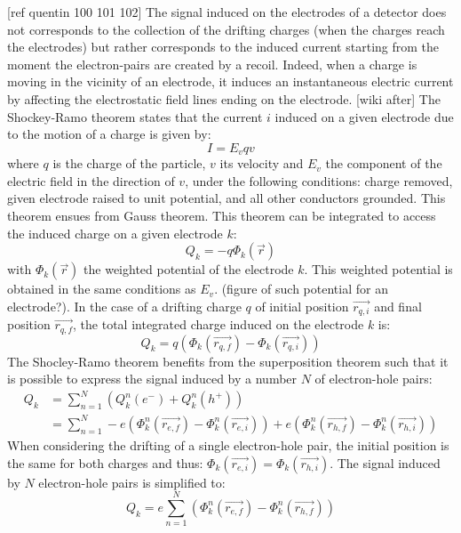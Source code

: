 [ref quentin 100 101 102]
The signal induced on the electrodes of a detector does not corresponds to the collection of the drifting charges (when the charges reach the electrodes) but rather corresponds to the induced current starting from the moment the electron-pairs are created by a recoil. Indeed, when a charge is moving in the vicinity of an electrode, it induces an instantaneous electric current by affecting the electrostatic field lines ending on the electrode. 
[wiki after]
The Shockey-Ramo theorem states that the current $i$ induced on a given electrode due to the motion of a charge is given by:
\begin{equation}
I = E_v q v
\end{equation}
where $q$ is the charge of the particle, $v$ its velocity and $E_v$ the component of the electric field in the direction of $v$, under the following conditions: charge removed, given electrode raised to unit potential, and all other conductors grounded. This theorem ensues from Gauss theorem.
This theorem can be integrated to access the induced charge on a given electrode $k$:
\begin{equation}
Q_k = - q \Phi_k(\vec{r})
\end{equation}
with $\Phi_k(\vec{r})$ the weighted potential of the electrode $k$. This weighted potential is obtained in the same conditions as $E_v$. (figure of such potential for an electrode?).
In the case of a drifting charge $q$ of initial position $\vec{r_{q,i}}$ and final position $\vec{r_{q,f}}$, the total integrated charge induced on the electrode $k$ is:
\begin{equation}
Q_k = q \left( \Phi_k (\vec{r_{q,f}}) - \Phi_k (\vec{r_{q,i}}) \right)
\end{equation}
The Shocley-Ramo theorem benefits from the superposition theorem such that it is possible to express the signal induced by a number $N$ of electron-hole pairs:
\begin{align}
Q_k &= \sum_{n=1}^{N} \left( Q_k^n(e^-) + Q_k^n(h^+) \right) \\
&= \sum_{n=1}^{N} -e \left( \Phi_k^n (\vec{r_{e,f}}) - \Phi_k^n (\vec{r_{e,i}}) \right) +e \left( \Phi_k^n (\vec{r_{h,f}}) - \Phi_k^n (\vec{r_{h,i}}) \right)
\end{align}
When considering the drifting of a single electron-hole pair, the initial position is the same for both charges and thus: $\Phi_k (\vec{r_{e,i}}) = \Phi_k (\vec{r_{h,i}})$.
The signal induced by $N$ electron-hole pairs is simplified to:
\begin{equation}
Q_k = e \sum_{n=1}^{N} \left( \Phi_k^n (\vec{r_{e,f}}) - \Phi_k^n (\vec{r_{h,f}}) \right)
\end{equation}
